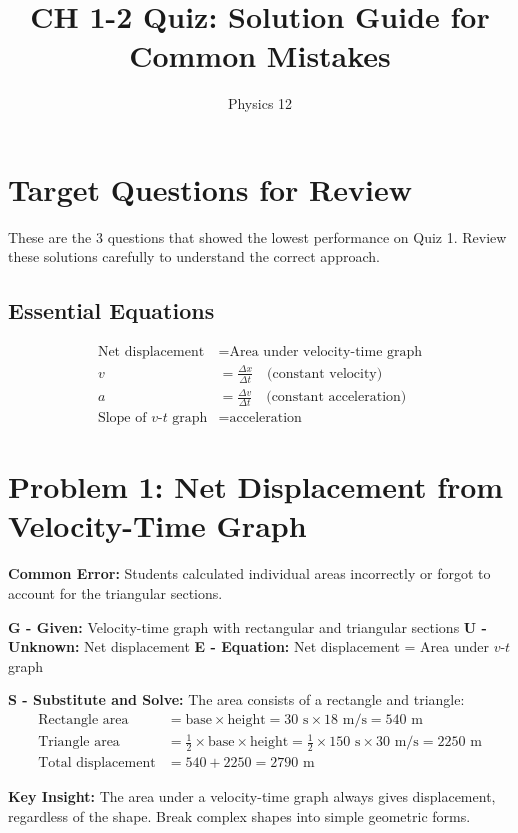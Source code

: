 \documentclass[12pt]{article}
\title{CH 1-2 Quiz: Solution Guide for Common Mistakes}
\author{Physics 12}
\date{}
\begin{document}
\maketitle

\section{Target Questions for Review}
These are the 3 questions that showed the lowest performance on Quiz 1. Review these solutions carefully to understand the correct approach.

\subsection{Essential Equations}
\begin{align}
\text{Net displacement} &= \text{Area under velocity-time graph} \\
v &= \frac{\Delta x}{\Delta t} \quad \text{(constant velocity)} \\
a &= \frac{\Delta v}{\Delta t} \quad \text{(constant acceleration)} \\
\text{Slope of } v\text{-}t \text{ graph} &= \text{acceleration}
\end{align}

\section{Problem 1: Net Displacement from Velocity-Time Graph}
\textbf{Common Error:} Students calculated individual areas incorrectly or forgot to account for the triangular sections.

\textbf{G - Given:} Velocity-time graph with rectangular and triangular sections
\textbf{U - Unknown:} Net displacement
\textbf{E - Equation:} Net displacement = Area under $v$-$t$ graph

\textbf{S - Substitute and Solve:}
The area consists of a rectangle and triangle:
\begin{align}
\text{Rectangle area} &= \text{base} \times \text{height} = 30 \text{ s} \times 18 \text{ m/s} = 540 \text{ m} \\
\text{Triangle area} &= \frac{1}{2} \times \text{base} \times \text{height} = \frac{1}{2} \times 150 \text{ s} \times 30 \text{ m/s} = 2250 \text{ m} \\
\text{Total displacement} &= 540 + 2250 = 2790 \text{ m}
\end{align}

\textbf{Key Insight:} The area under a velocity-time graph always gives displacement, regardless of the shape. Break complex shapes into simple geometric forms.
\end{document}
